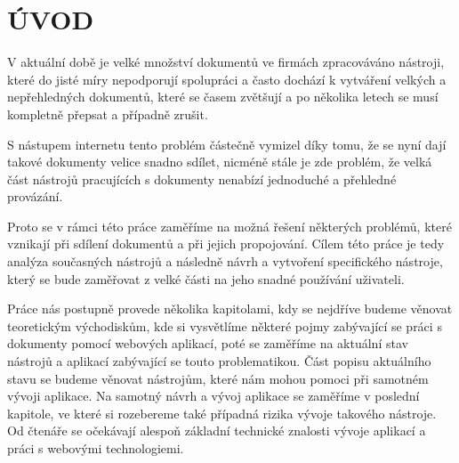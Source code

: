 \chapter*{ÚVOD}
\par V aktuální době je velké množství dokumentů ve firmách zpracováváno nástroji, které do jisté míry nepodporují spolupráci a často dochází k vytváření velkých a nepřehledných dokumentů, které se časem zvětšují a po několika letech se musí kompletně přepsat a případně zrušit.

\par S nástupem internetu tento problém částečně vymizel díky tomu, že se nyní dají takové dokumenty velice snadno sdílet, nicméně stále je zde problém, že velká část nástrojů pracujících s dokumenty nenabízí jednoduché a přehledné provázání.

\par Proto se v rámci této práce zaměříme na možná řešení některých problémů, které vznikají při sdílení dokumentů a při jejich propojování. Cílem této práce je tedy analýza současných nástrojů a následně návrh a vytvoření specifického nástroje, který se bude zaměřovat z velké části na jeho snadné používání uživateli.

\par Práce nás postupně provede několika kapitolami, kdy se nejdříve budeme věnovat teoretickým východiskům, kde si vysvětlíme některé pojmy zabývající se práci s dokumenty pomocí webových aplikací, poté se zaměříme na aktuální stav nástrojů a aplikací zabývající se touto problematikou. Část popisu aktuálního stavu se budeme věnovat nástrojům, které nám mohou pomoci při samotném vývoji aplikace. Na samotný návrh a vývoj aplikace se zaměříme v poslední kapitole, ve které si rozebereme také případná rizika vývoje takového nástroje. Od čtenáře se očekávají alespoň základní technické znalosti vývoje aplikací a práci s webovými technologiemi.

